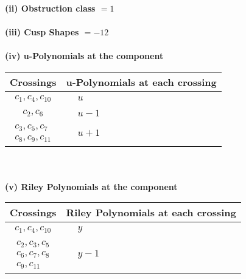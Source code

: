 \documentclass[1p]{elsarticle_modified}
\theoremstyle{definition}
\begin{document}
\flushleft \textbf{(ii) Obstruction class $= 1$}\\~\\
\flushleft \textbf{(iii) Cusp Shapes $= -12$}\\~\\
\newpage\renewcommand{\arraystretch}{1}
\flushleft \textbf{(iv) u-Polynomials at the component}\newline \\
\begin{tabular}{m{50pt}|m{274pt}}
Crossings & \hspace{64pt}u-Polynomials at each crossing \\
\hline $$\begin{aligned}c_{1},c_{4},c_{10}\end{aligned}$$&$\begin{aligned}
&u
\end{aligned}$\\
\hline $$\begin{aligned}c_{2},c_{6}\end{aligned}$$&$\begin{aligned}
&u-1
\end{aligned}$\\
\hline $$\begin{aligned}c_{3},c_{5},c_{7}\\c_{8},c_{9},c_{11}\end{aligned}$$&$\begin{aligned}
&u+1
\end{aligned}$\\
\hline
\end{tabular}\\~\\
\newpage\renewcommand{\arraystretch}{1}
\flushleft \textbf{(v) Riley Polynomials at the component}\newline \\
\begin{tabular}{m{50pt}|m{274pt}}
Crossings & \hspace{64pt}Riley Polynomials at each crossing \\
\hline $$\begin{aligned}c_{1},c_{4},c_{10}\end{aligned}$$&$\begin{aligned}
&y
\end{aligned}$\\
\hline $$\begin{aligned}c_{2},c_{3},c_{5}\\c_{6},c_{7},c_{8}\\c_{9},c_{11}\end{aligned}$$&$\begin{aligned}
&y-1
\end{aligned}$\\
\hline
\end{tabular}\\~\\
\end{document}
